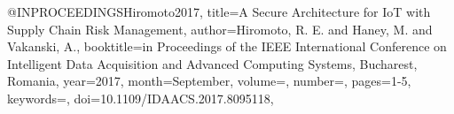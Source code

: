 @INPROCEEDINGS{Hiromoto2017,
title={A Secure Architecture for IoT with Supply Chain Risk Management},
author={Hiromoto, R. E. and Haney, M. and Vakanski, A.},
booktitle={in Proceedings of the IEEE International Conference on Intelligent Data Acquisition and Advanced Computing Systems, Bucharest, Romania}, 
year={2017},
month={September},
volume={},
number={},
pages={1-5},
keywords={},
doi={10.1109/IDAACS.2017.8095118},
}
